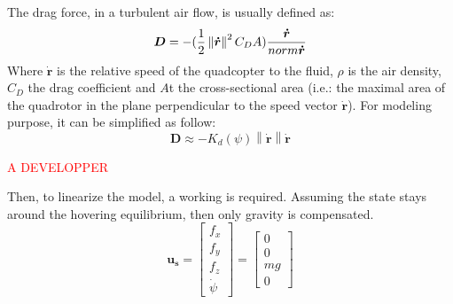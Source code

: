 \documentclass[a4paper, 12pt]{report}
\newcommand\norm[1]{\left\lVert#1\right\rVert}
\begin{document}
The drag force, in a turbulent air flow, is usually defined as:
\[ \boldsymbol{D} = -(\frac{1}{2} \norm{\boldsymbol{\dot r}}^2 C_D A) \frac{\boldsymbol{\dot r}}{\\norm{\boldsymbol{\dot r}}}\]
Where $\boldsymbol{\dot r}$ is the relative speed of the quadcopter to the fluid, $\rho$ is the air density, $C_D$  the drag coefficient and $A$t the cross-sectional area (i.e.: the maximal area of the quadrotor in the plane perpendicular to the speed vector $\boldsymbol{\dot r}$). For modeling purpose, it can be simplified as follow:
\[ \boldsymbol{D} \approx -K_d(\psi) \norm{\boldsymbol{\dot r}} \boldsymbol{\dot r}\]

\textcolor{red}{A DEVELOPPER}

Then, to linearize the model, a working is required. Assuming the state stays around the hovering equilibrium, then only gravity is compensated.
\[ \boldsymbol{u_s} = \begin{bmatrix} f_x \\ f_y \\ f_z \\ \dot \psi \end{bmatrix} = \begin{bmatrix}  0\\ 0\\ mg \\ 0\end{bmatrix} \]
\end{document}
